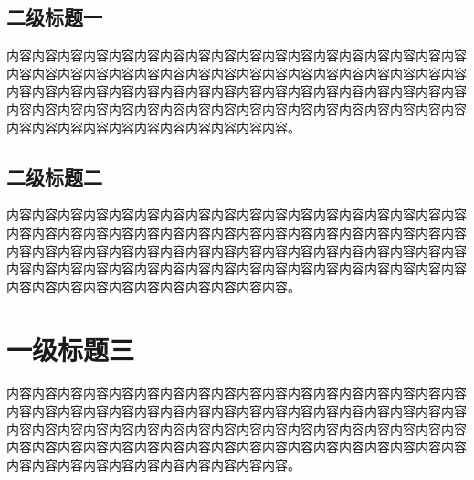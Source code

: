 \documentclass{article}
\newcommand{\sihao}{\fontsize{14pt}{\baselineskip}\selectfont}
\newcommand{\xiaosihao}{\fontsize{12pt}{\baselineskip}\selectfont}
\newcommand{\xiaowuhao}{\fontsize{9pt}{\baselineskip}\selectfont}
\begin{document}
\subsection{\bfseries \songti \xiaosihao 二级标题一}
内容内容内容内容内容内容内容内容内容内容内容内容内容内容内容内容内容内容内容内容内容内容内容内容内容内容内容内容内容内容内容内容内容内容内容内容内容内容内容内容内容内容内容内容内容内容内容内容内容内容内容内容内容内容内容内容内容内容内容内容内容内容内容内容内容内容内容内容内容内容内容内容内容内容内容内容内容内容内容内容内容内容内容。

\subsection{\bfseries \songti \xiaosihao 二级标题二}
内容内容内容内容内容内容内容内容内容内容内容内容内容内容内容内容内容内容内容内容内容内容内容内容内容内容内容内容内容内容内容内容内容内容内容内容内容内容内容内容内容内容内容内容内容内容内容内容内容内容内容内容内容内容内容内容内容内容内容内容内容内容内容内容内容内容内容内容内容内容内容内容内容内容内容内容内容内容内容内容内容内容内容。

\section{\bfseries \kaishu \sihao 一级标题三}
内容内容内容内容内容内容内容内容内容内容内容内容内容内容内容内容内容内容内容内容内容内容内容内容内容内容内容内容内容内容内容内容内容内容内容内容内容内容内容内容内容内容内容内容内容内容内容内容内容内容内容内容内容内容内容内容内容内容内容内容内容内容内容内容内容内容内容内容内容内容内容内容内容内容内容内容内容内容内容内容内容内容内容。


\small
\xiaowuhao


\end{document}
